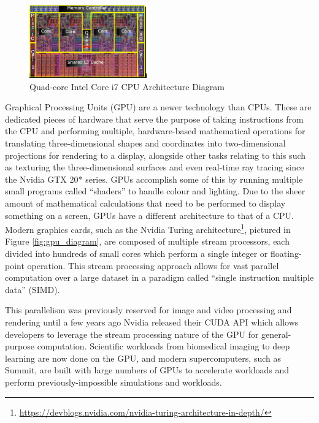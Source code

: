 \documentclass[conference]{IEEEtran}
\begin{document}
\begin{figure}
\centering
\includegraphics[width=0.45\textwidth]{images/cpu_diagram.png}
\caption{Quad-core Intel Core i7 CPU Architecture Diagram}
\label{fig:cpu_diagram}
\end{figure}

Graphical Processing Units (GPU) are a newer technology than CPUs. These are dedicated pieces of hardware that serve the purpose of taking instructions from the CPU and performing multiple, hardware-based mathematical operations for translating three-dimensional shapes and coordinates into two-dimensional projections for rendering to a display, alongside other tasks relating to this such as texturing the three-dimensional surfaces and even real-time ray tracing since the Nvidia GTX 20* series. GPUs accomplish some of this by running multiple small programs called ``shaders” to handle colour and lighting. Due to the sheer amount of mathematical calculations that need to be performed to display something on a screen, GPUs have a different architecture to that of a CPU. Modern graphics cards, such as the Nvidia Turing architecture\footnote{\url{https://devblogs.nvidia.com/nvidia-turing-architecture-in-depth/}}, pictured in Figure \ref{fig:gpu_diagram}, are composed of multiple stream processors, each divided into hundreds of small cores which perform a single integer or floating-point operation. This stream processing approach allows for vast parallel computation over a large dataset in a paradigm called ``single instruction multiple data” (SIMD).

This parallelism was previously reserved for image and video processing and rendering until a few years ago Nvidia released their CUDA API\cite{cuda_talk}\cite{CUDA} which allows developers to leverage the stream processing nature of the GPU for general-purpose computation. Scientific workloads from biomedical imaging\cite{luebke2008cuda} to deep learning\cite{tang2013deep} are now done on the GPU, and modern supercomputers, such as Summit, are built with large numbers of GPUs to accelerate workloads and perform previously-impossible simulations and workloads.
\end{document}
